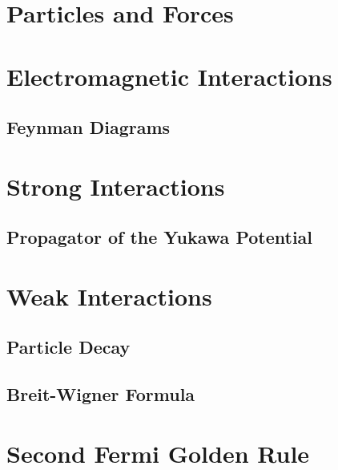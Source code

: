 \documentclass[../qm.tex]{subfiles}
\begin{document}
\section{Particles and Forces}
\section{Electromagnetic Interactions}
\subsection{Feynman Diagrams}
\section{Strong Interactions}
\subsection{Propagator of the Yukawa Potential}
\section{Weak Interactions}
\subsection{Particle Decay}
\subsection{Breit-Wigner Formula}
\section{Second Fermi Golden Rule}
\end{document}
